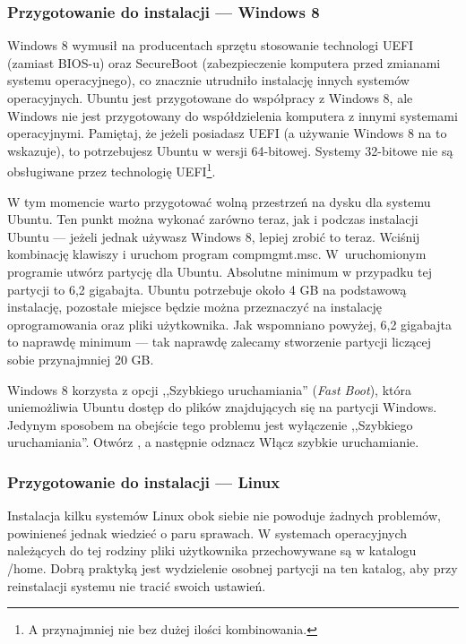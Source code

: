 \subsubsection{Przygotowanie do instalacji --- Windows 8}
\label{sec:przygotowanie_windows8}
Windows 8 wymusił na producentach sprzętu stosowanie technologi UEFI (zamiast BIOS-u) oraz SecureBoot (zabezpieczenie komputera przed zmianami systemu operacyjnego), co znacznie utrudniło instalację innych systemów operacyjnych. Ubuntu jest przygotowane do współpracy z Windows 8, ale Windows nie jest przygotowany do współdzielenia komputera z innymi systemami operacyjnymi. Pamiętaj, że jeżeli posiadasz UEFI (a używanie Windows 8 na to wskazuje), to potrzebujesz Ubuntu w wersji 64-bitowej. Systemy 32-bitowe nie są obsługiwane przez technologię UEFI\footnote{A przynajmniej nie bez dużej ilości kombinowania.}.

W tym momencie warto przygotować wolną przestrzeń na dysku dla systemu Ubuntu. Ten punkt można wykonać zarówno teraz, jak i podczas instalacji Ubuntu --- jeżeli jednak używasz Windows 8, lepiej zrobić to teraz. Wciśnij kombinację klawiszy  i uruchom program \textcolor{ubuntu_orange}{compmgmt.msc}. W~uruchomionym programie utwórz partycję dla Ubuntu. Absolutne minimum w przypadku tej partycji to 6,2 gigabajta. Ubuntu potrzebuje około 4 GB na podstawową instalację, pozostałe miejsce będzie można przeznaczyć na instalację oprogramowania oraz pliki użytkownika. Jak wspomniano powyżej, 6,2 gigabajta to naprawdę minimum --- tak naprawdę zalecamy stworzenie partycji liczącej sobie przynajmniej 20 GB.

Windows 8 korzysta z opcji ,,Szybkiego uruchamiania'' (\textit{Fast Boot}), która uniemożliwia Ubuntu dostęp do plików znajdujących się na partycji Windows. Jedynym sposobem na obejście tego problemu jest wyłączenie ,,Szybkiego uruchamiania''. Otwórz , a następnie odznacz \textcolor{ubuntu_orange}{Włącz szybkie uruchamianie}.
\subsubsection{Przygotowanie do instalacji --- Linux}
\label{sec:przygotowanie_linux}
Instalacja kilku systemów Linux obok siebie nie powoduje żadnych problemów, powinieneś jednak wiedzieć o paru sprawach. W systemach operacyjnych należących do tej rodziny pliki użytkownika przechowywane są w katalogu /home. Dobrą praktyką jest wydzielenie osobnej partycji na ten katalog, aby przy reinstalacji systemu nie tracić swoich ustawień.

